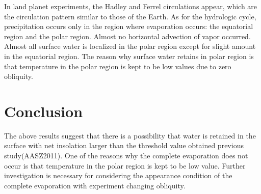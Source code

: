 \documentclass[dvipdfmx,twocolumn,10pt]{jsarticle}
\begin{document}
In land planet experiments, the Hadley and Ferrel circulations appear, which are the circulation pattern similar to those of the Earth. 
As for the hydrologic cycle, precipitation occurs only in the region where evaporation occurs: 
the equatorial region and the polar region. 
Almost no horizontal advection of vapor occurred. 
Almost all surface water is localized in the polar region except for slight amount in the equatorial region. 
The reason why surface water retains in polar region is that temperature in the polar region is kept to be low values due to zero obliquity. 

\vspace{-0.2zh}
\section{Conclusion}
\vspace{-0.5zh}
The above results suggest that there is a possibility that water is retained in the surface with net insolation larger than the threshold value obtained previous study(AASZ2011). 
One of the reasons why the complete evaporation does not occur is that temperature in the polar region is kept to be low value. 
Further investigation is necessary for considering the appearance condition of the complete evaporation with experiment changing obliquity. 
\end{document}
